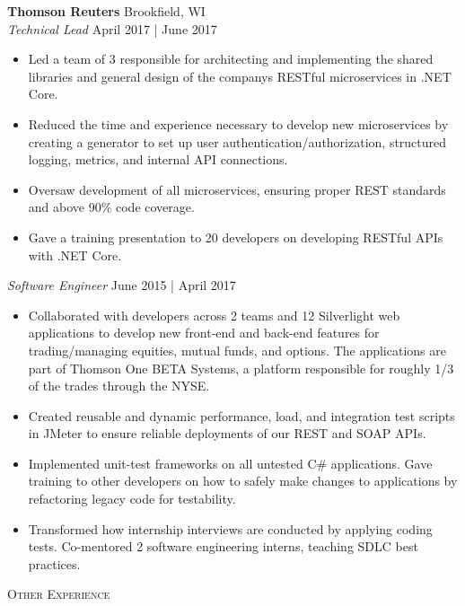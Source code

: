 \documentclass[a4paper]{article}
\newcommand{\lineunder} {
    \vspace*{-8pt} \\
    \hspace*{-18pt} \hrulefill \\
}
\newcommand{\header} [1] {
    {\hspace*{-18pt}\vspace*{6pt} \textsc{#1}}
    \vspace*{-6pt} \lineunder
}
\begin{document}
\textbf{Thomson Reuters} \hfill Brookfield, WI\\
\textit{Technical Lead} \hfill April 2017 | June 2017\\
\vspace{-1mm}
\begin{itemize} \itemsep 1pt
	\item Led a team of 3 responsible for architecting and implementing the shared libraries and general design of the company\textquotesingle{}s RESTful microservices in .NET Core.
	\item Reduced the time and experience necessary to develop new microservices by creating a generator to set up user authentication/authorization, structured logging, metrics, and internal API connections.
	\item Oversaw development of all microservices, ensuring proper REST standards and above 90\% code coverage.
	\item Gave a training presentation to 20 developers on developing RESTful APIs with .NET Core.
\end{itemize}
\vspace{-1mm}
\textit{Software Engineer} \hfill June 2015 | April 2017\\
\vspace{-1mm}
\begin{itemize} \itemsep 1pt
	\item Collaborated with developers across 2 teams and 12 Silverlight web applications to develop new front-end and back-end features for trading/managing equities, mutual funds, and options. The applications are part of Thomson One BETA Systems, a platform responsible for roughly 1/3 of the trades through the NYSE.
	\item Created reusable and dynamic performance, load, and integration test scripts in JMeter to ensure reliable deployments of our REST and SOAP APIs.
	\item Implemented unit-test frameworks on all untested C\# applications. Gave training to other developers on how to safely make changes to applications by refactoring legacy code   for testability.
	\item Transformed how internship interviews are conducted by applying coding tests. Co-mentored 2 software engineering interns, teaching SDLC best practices.
\end{itemize}
\vspace{-1mm}

\header{Other Experience}
\vspace{1mm}
\end{document}
